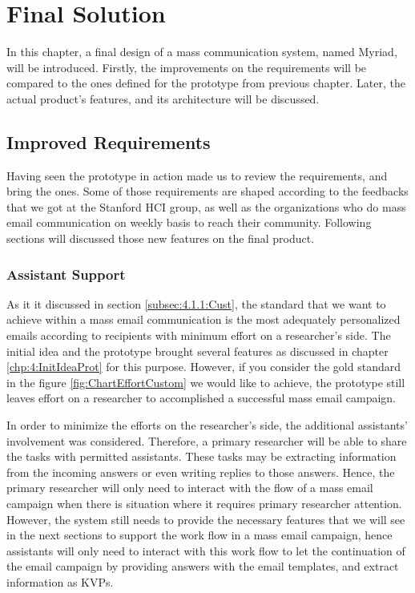 \chapter{Final Solution}
\label{chp:5:FinaSolu}
In this chapter, a final design of a mass communication system, named Myriad, will be introduced. Firstly, the improvements on the requirements will be compared to the ones defined for the prototype from previous chapter. Later, the actual product's features, and its architecture will be discussed.

\section{Improved Requirements}
\label{sec:5.1:ImprRequ}

Having seen the prototype in action made us to review the requirements, and bring the ones. Some of those requirements are shaped according to the feedbacks that we got at the Stanford \ac{HCI} group, as well as the organizations who do mass email communication on weekly basis to reach their community. Following sections will discussed those new features on the final product. 

\subsection{Assistant Support}
\label{subsec:5.1.1:AssiSupp}
As it it discussed in section \ref{subsec:4.1.1:Cust}, the standard that we want to achieve within a mass email communication is the most adequately personalized emails according to recipients with minimum effort on a researcher's side. The initial idea and the prototype brought several features as discussed in chapter \ref{chp:4:InitIdeaProt} for this purpose. However, if you consider the gold standard in the figure \ref{fig:ChartEffortCustom} we would like to achieve, the prototype still leaves effort on a researcher to accomplished a successful mass email campaign.
\vspace{1cm}

In order to minimize the efforts on the researcher's side, the additional assistants' involvement was considered. Therefore, a primary researcher will be able to share the tasks with permitted assistants. These tasks may be extracting information from the incoming answers or even writing replies to those answers. Hence, the primary researcher will only need to interact with the flow of a mass email campaign when there is situation where it requires primary researcher attention. However, the system still needs to provide the necessary features that we will see in the next sections to support the work flow in a mass email campaign, hence assistants will only need to interact with this work flow to let the continuation of the email campaign by providing answers with the email templates, and extract information as \ac{KVP}s.

